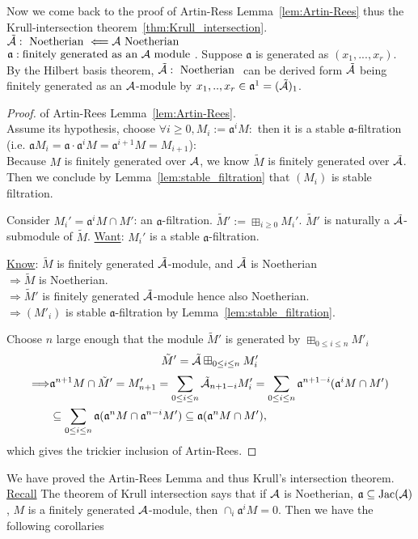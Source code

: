 \documentclass[11pt]{article}
\newcommand{\sca}{{\mathfrak a}}
\newcommand{\cala}{{\cal A}}
\newcommand{\Lrta}{\Longrightarrow}
\newcommand{\Llta}{\Longleftarrow}
\begin{document}
Now we come back to the proof of Artin-Ress Lemma~\ref{lem:Artin-Rees} thus the Krull-intersection theorem~\ref{thm:Krull_intersection}.
$\tilde{\cala}:\text{ Noetherian }\Llta \cala \text{ Noetherian}$\\
$\sca: \text{finitely generated as an $\cala$ module }$. Suppose $\sca$ is generated as $(x_1,...,x_r)$. By the Hilbert basis theorem, $\tilde{\cala}:\text{ Noetherian }$ can be derived form $\tilde{\cala}$ being finitely generated as an $\cala$-module by $x_1,..,x_r\in\sca^1= (\tilde{\cala})_1$.

\begin{proof} of Artin-Rees Lemma~\ref{lem:Artin-Rees}.\\
Assume its hypothesis, choose $\forall i\geq 0, M_i:=\sca^i M:$ then it is a stable $\sca$-filtration (i.e. $\sca M_i=\sca\cdot \sca^i M=\sca^{i+1}M=M_{i+1}$):\\
 Because $M$ is finitely generated over $\cala$, we know $\tilde{M}$ is finitely generated over $\tilde{\cala}$. Then we conclude by Lemma~\ref{lem:stable_filtration} that $(M_i)$ is stable filtration.

Consider $M_i'=\sca^i M\cap M'$: an $\sca$-filtration. $\tilde{M}':=\boxplus_{i\geq 0}M_i'$. $\tilde{M}'$ is naturally a $\tilde{\cala}$-submodule of $\tilde{M}$. \underline{Want}: $M_i'$ is a stable $\sca$-filtration.

\underline{Know}:
$\tilde{M} $ is finitely generated $\tilde{\cala}$-module, and $\tilde{\cala}$ is Noetherian\\
$\Lrta \tilde{M}$ is Noetherian.\\
$\Lrta \tilde{M}'$ is finitely generated $\tilde{\cala}$-module hence also Noetherian.\\
$\Lrta (M'_i)$ is stable $\sca$-filtration by Lemma~\ref{lem:stable_filtration}. 


 Choose $n$ large enough that the module $\tilde{M}'$ is generated by $\boxplus_{0\leq i\leq n} M'_i$
 $$
 \tilde{M}'=\tilde{\cala}\boxplus_{0\leq i\leq n} M'_i
 $$
 $$
 \begin{aligned}
 \Lrta & \sca^{n+1}M\cap \tilde{M}'= M'_{n+1}=\sum_{0\leq i\leq n} \tilde{\cala}_{n+1-i}M'_i=\sum_{0\leq i\leq n}\sca^{n+1-i}(\sca^i M\cap M')\\
 &\subseteq\sum_{0\leq i\leq n}\sca(\sca^n M\cap \sca^{n-i}M')\subseteq \sca(\sca^n M\cap M'),
 \end{aligned}
 $$
which gives the trickier inclusion of Artin-Rees.
\end{proof}
We have proved the Artin-Rees Lemma and thus Krull's intersection theorem.
\underline{Recall}
The theorem of Krull intersection says that if $\cala$ is Noetherian, $\sca\subseteq \text{Jac}(\cala)$, $M$ is a finitely generated $\cala$-module, then $\cap_i\sca^i M=0$. Then we have the following corollaries
\end{document}
